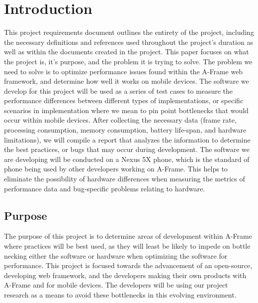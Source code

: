 \documentclass[letterpaper,10pt,draftclsnofoot,onecolumn,compsoc]{IEEEtran}
\begin{document}
\section{Introduction}
\begin{singlespace}
\noindent
This project requirements document outlines the entirety of the project, including the necessary definitions and references used throughout the project's duration as well as within the documents created in the project. This paper focuses on what the project is, it's purpose, and the problem it is trying to solve. The problem we need to solve is to optimize performance issues found within the A-Frame web framework, and determine how well it works on mobile devices. The software we develop for this project will be used as a series of test cases to measure the performance differences between different types of implementations, or specific scenarios in implementation where we mean to pin point bottlenecks that would occur within mobile devices. After collecting the necessary data (frame rate, processing consumption, memory consumption, battery life-span, and hardware limitations), we will compile a report that analyzes the information to determine the best practices, or bugs that may occur during development. The software we are developing will be conducted on a Nexus 5X phone, which is the standard of phone being used by other developers working on A-Frame. This helps to eliminate the possibility of hardware differences when measuring the metrics of performance data and bug-specific problems relating to hardware.
\end{singlespace}

\subsection{Purpose}
\begin{singlespace}
\noindent
The purpose of this project is to determine areas of development within A-Frame where practices will be best used, as they will least be likely to impede on bottle necking either the software or hardware when optimizing the software for performance. This project is focused towards the advancement of an open-source, developing web framework, and the developers making their own products with A-Frame and for mobile devices. The developers will be using our project research as a means to avoid these bottlenecks in this evolving environment.
\end{singlespace}
\end{document}
